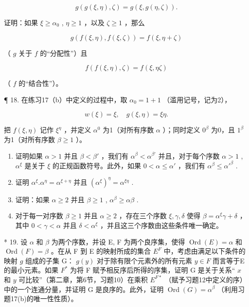 \[
g (g (\xi , \eta), \zeta) = g (\xi , g (\eta , \zeta)).
\]

证明：如果 \(\xi \geqslant \alpha_0\) , \(\eta \geqslant 1\) ，以及 \(\zeta \geqslant 1\) ，那么

\[
g (f (\xi , \eta), f (\xi , \zeta)) = f (\xi , \eta + \zeta)
\]

（ \(g\) 关于 \(f\) 的“分配性”）且

\[
f (f (\xi , \eta), \zeta) = f (\xi , \eta \zeta)
\]

（ \(f\) 的“结合性”）。

¶ 18. 在练习17（b）中定义的过程中，取 \(\alpha_{0}=1+1\) （滥用记号，记为2），

\[
w (\xi) = \xi , \quad g (\xi , \eta) = \xi \eta .
\]

把 \(f(\xi, \eta)\) 记作 \(\xi^{\eta}\) ，并定义 \(\alpha^{0}\) 为1（对所有序数 \(\alpha\) ）；同时定义 \(0^{\beta}\) 为0，且 \(1^{\beta}\) 为1（对所有序数 \(\beta \geqslant 1\) ）。

\begin{enumerate}
\def\labelenumi{(\alph{enumi})}
\item
  证明如果 \(\alpha > 1\) 并且 \(\beta < \beta'\) ，我们有 \(\alpha^{\beta} < \alpha^{\beta'}\) 并且，对于每个序数 \(\alpha > 1\) , \(\alpha^{\xi}\) 是关于 \(\xi\) 的正规函数符号。此外，如果 \(0 < \alpha \leqslant \alpha'\) ，我们有 \(\alpha^{\beta} \leqslant \alpha'^{\beta}\) .
\item
  证明 \(\alpha^{\xi}.\alpha^{\eta} = \alpha^{\xi +\eta}\) 并且 \((\alpha^{\xi})^{\eta} = \alpha^{\xi \eta}\) .
\item
  证明：如果 \(\alpha \geqslant 2\) 并且 \(\beta \geqslant 1\) , \(\alpha^{\beta} \geqslant \alpha \beta\) .
\item
  对于每一对序数 \(\beta \geqslant 1\) 并且 \(\alpha \geqslant 2\) ，存在三个序数 \(\xi, \gamma, \delta\) 使得 \(\beta = \alpha^{\xi}\gamma + \delta\) ，其中 \(0 < \gamma < \alpha\) 并且 \(\delta < \alpha^{\xi}\) ，并且这三个序数由这些条件唯一确定。
\end{enumerate}

* 19. 设 \(\alpha\) 和 \(\beta\) 为两个序数，并设 E, F 为两个良序集，使得 \(\operatorname{Ord}(E) = \alpha\) 和 \(\operatorname{Ord}(F) = \beta\) 。在从 F 到 E 的映射所成的集合 \(E^F\) 中，考虑由满足以下条件的映射 \(g\) 组成的子集 G： \(g(y)\) 对于除有限个元素外的所有元素 \(y \in F\) 而言等于E的最小元素。如果 \(F^*\) 为将 F 赋予相反序后所得的序集，证明 G 是关于关系“ \(x\) 和 \(y\) 可比较”（第二章，第6节，习题10）在乘积 \(E^{F*}\) （赋予习题12中定义的序）中的一个连通分量，并证明 G 是良序的。此外，证明 \(\operatorname{Ord}(G) = \alpha^\beta\) （利用习题17(b)的唯一性性质）。

